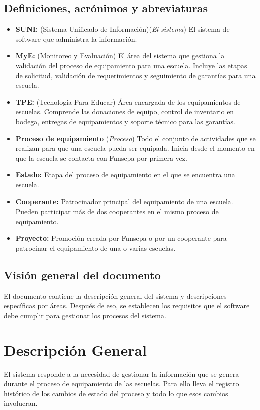 \documentclass[11pt]{report}
\begin{document}
	\section{Definiciones, acrónimos y abreviaturas}
	\begin{itemize}
		\item \textbf{SUNI:} (Sistema Unificado de Información)(\textit{El sistema}) El sistema de software que administra la información.
		\item \textbf{MyE:} (Monitoreo y Evaluación) El área del sistema que gestiona la validación del proceso de equipamiento para una escuela. Incluye las etapas de solicitud, validación de requerimientos y seguimiento de garantías para una escuela.
		\item \textbf{TPE:} (Tecnología Para Educar) Área encargada de los equipamientos de escuelas. Comprende las donaciones de equipo, control de inventario en bodega, entregas de equipamientos y soporte técnico para las garantías.
		\item \textbf{Proceso de equipamiento} (\textit{Proceso}) Todo el conjunto de actividades que se realizan para que una escuela pueda ser equipada. Inicia desde el momento en que la escuela se contacta con Funsepa por primera vez.
		\item \textbf{Estado:} Etapa del proceso de equipamiento en el que se encuentra una escuela.
		\item \textbf{Cooperante:} Patrocinador principal del equipamiento de una escuela. Pueden participar más de dos cooperantes en el mismo proceso de equipamiento.
		\item \textbf{Proyecto:} Promoción creada por Funsepa o por un cooperante para patrocinar el equipamiento de una o varias escuelas.
	\end{itemize}
	
	\section{Visión general del documento}
	El documento contiene la descripción general del sistema y descripciones específicas por áreas. Después de eso, se establecen los requisitos que el software debe cumplir para gestionar los procesos del sistema.
	
	\chapter{Descripción General}
	El sistema responde a la necesidad de gestionar la información que se genera durante el proceso de equipamiento de las escuelas. Para ello lleva el registro histórico de los cambios de estado del proceso y todo lo que esos cambios involucran.
	
\end{document}
